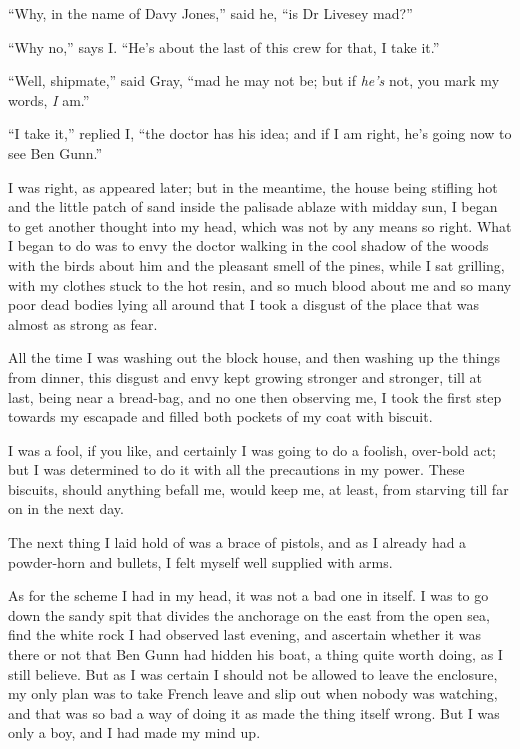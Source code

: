 \enquote{Why, in the name of Davy Jones,} said he, \enquote{is Dr Livesey mad?}

\enquote{Why no,} says I. \enquote{He’s about the last of this crew for that, I take it.}

\enquote{Well, shipmate,} said Gray, \enquote{mad he may not be; but if \textit{he’s} not, you mark my words, \textit{I} am.}

\enquote{I take it,} replied I, \enquote{the doctor has his idea; and if I am right, he’s going now to see Ben Gunn.}

I was right, as appeared later; but in the meantime, the house being stifling hot and the little patch of sand inside the palisade ablaze with midday sun, I began to get another thought into my head, which was not by any means so right. What I began to do was to envy the doctor walking in the cool shadow of the woods with the birds about him and the pleasant smell of the pines, while I sat grilling, with my clothes stuck to the hot resin, and so much blood about me and so many poor dead bodies lying all around that I took a disgust of the place that was almost as strong as fear.

All the time I was washing out the block house, and then washing up the things from dinner, this disgust and envy kept growing stronger and stronger, till at last, being near a bread-bag, and no one then observing me, I took the first step towards my escapade and filled both pockets of my coat with biscuit.

I was a fool, if you like, and certainly I was going to do a foolish, over-bold act; but I was determined to do it with all the precautions in my power. These biscuits, should anything befall me, would keep me, at least, from starving till far on in the next day.

The next thing I laid hold of was a brace of pistols, and as I already had a powder-horn and bullets, I felt myself well supplied with arms.

As for the scheme I had in my head, it was not a bad one in itself. I was to go down the sandy spit that divides the anchorage on the east from the open sea, find the white rock I had observed last evening, and ascertain whether it was there or not that Ben Gunn had hidden his boat, a thing quite worth doing, as I still believe. But as I was certain I should not be allowed to leave the enclosure, my only plan was to take French leave and slip out when nobody was watching, and that was so bad a way of doing it as made the thing itself wrong. But I was only a boy, and I had made my mind up.

